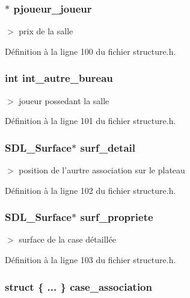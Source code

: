 \subsubsection{$\ast$ {\bf pjoueur\_\-joueur}}\label{structcases_ba5ddcb460f45baa1ac6d5b25436dd73}


$>$ prix de la salle 



D\'{e}finition \`{a} la ligne 100 du fichier structure.h.
\subsubsection{\setlength{\rightskip}{0pt plus 5cm}int {\bf int\_\-autre\_\-bureau}}\label{structcases_33bb070b7cbf8c9a7cb8fdc9c7eea5b1}


$>$ joueur possedant la salle 



D\'{e}finition \`{a} la ligne 101 du fichier structure.h.
\subsubsection{\setlength{\rightskip}{0pt plus 5cm}SDL\_\-Surface$\ast$ {\bf surf\_\-detail}}\label{structcases_fe23bd51c8293f90f42d24e9cbd01578}


$>$ position de l'aurtre association sur le plateau 



D\'{e}finition \`{a} la ligne 102 du fichier structure.h.
\subsubsection{\setlength{\rightskip}{0pt plus 5cm}SDL\_\-Surface$\ast$ {\bf surf\_\-propriete}}\label{structcases_53156a5bfb684b6baa312d215af30777}


$>$ surface de la case d\'{e}taill\'{e}e 



D\'{e}finition \`{a} la ligne 103 du fichier structure.h.
\subsubsection{\setlength{\rightskip}{0pt plus 5cm}struct \{ ... \}  {\bf case\_\-association}}\label{structcases_85a20ebff9fbdbf9edb6beffa041ca23}




